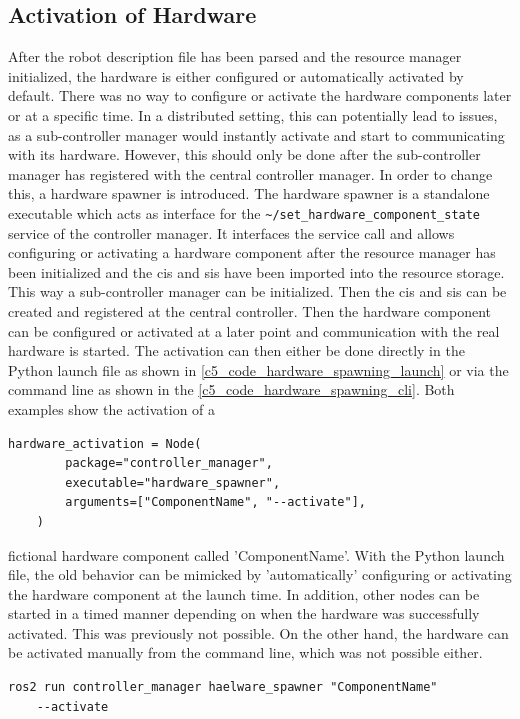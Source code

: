 \subsection{Activation of Hardware}
After the robot description file has been parsed and the resource manager initialized, the hardware is either configured or automatically activated by default. There was no way to configure or activate the hardware components later or at a specific time. In a distributed setting, this can potentially lead to issues, as a sub-controller manager would instantly activate and start to communicating with its hardware. However, this should only be done after the sub-controller manager has registered with the central controller manager.\newline
In order to change this, a hardware spawner is introduced. The hardware spawner is a standalone executable which acts as interface for the \lstset{language=C++,basicstyle=\small\ttfamily}\lstinline{~/set_hardware_component_state} service of the controller manager. It interfaces the service call and allows configuring or activating a hardware component after the resource manager has been initialized and the \glspl{ci} and \glspl{si} have been imported into the resource storage. This way a sub-controller manager can be initialized. Then the \glspl{ci} and \glspl{si} can be created and registered at the central controller. Then the hardware component can be configured or activated at a later point and communication with the real hardware is started.\newline
The activation can then either be done directly in the Python launch file as shown in \autoref{c5_code_hardware_spawning_launch} or via the command line as shown in the \autoref{c5_code_hardware_spawning_cli}. Both examples show the activation of a
\lstset{language=Python,basicstyle=\small}
\begin{lstlisting}[caption=Example of using the hardware spawner in a python launch file.,label=c5_code_hardware_spawning_launch]
    hardware_activation = Node(
        package="controller_manager",
        executable="hardware_spawner",
        arguments=["ComponentName", "--activate"],
    )
\end{lstlisting}
fictional hardware component called 'ComponentName'. With the Python launch file, the old behavior can be mimicked by  'automatically' configuring or activating the hardware component at the launch time. In addition, other nodes can be started in a timed manner depending on when the hardware was successfully activated. This was previously not possible. On the other hand, the hardware can be activated manually from the command line, which was not possible either.
\begin{lstlisting}[caption=Example of using the hardware spawner from command line., label=c5_code_hardware_spawning_cli]
ros2 run controller_manager haelware_spawner "ComponentName" 
    --activate
\end{lstlisting}

